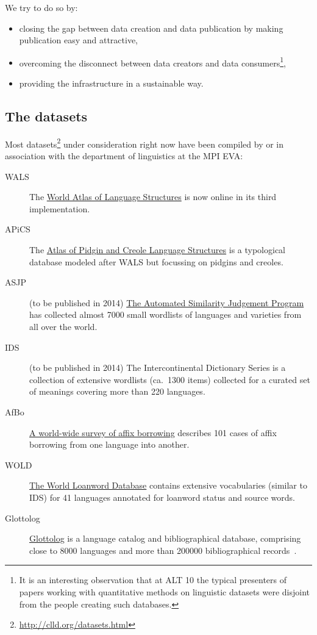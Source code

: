 \documentclass[a4paper,10pt]{article}
\begin{document}
We try to do so by:
\begin{itemize}
\item closing the gap between data creation and data publication by making publication easy and attractive,
\item overcoming the disconnect between data creators and data consumers\footnote{It is an interesting observation that at ALT 10 the typical presenters of papers working with quantitative methods on linguistic datasets were disjoint from the people creating such databases.},
\item providing the infrastructure in a sustainable way.
\end{itemize}

\subsection{The datasets}
Most datasets\footnote{\url{http://clld.org/datasets.html}} under consideration right now
have been compiled by or in association with the department of linguistics at the MPI EVA:
\begin{description}
\item[WALS] The \href{http://wals.info}{World Atlas of Language Structures} is now online in its third implementation.
\item[APiCS] The \href{http://apics-online.info}{Atlas of Pidgin and Creole Language Structures} is a typological database modeled after WALS but focussing on pidgins and creoles.
\item[ASJP] (to be published in 2014) \href{http://wwwstaff.eva.mpg.de/~wichmann/ASJPHomePage.htm}{The Automated Similarity Judgement Program} has collected almost 7000 small wordlists of languages and varieties from all over the world.
\item[IDS] (to be published in 2014) The Intercontinental Dictionary Series is a collection of extensive wordlists (ca.~1300 items)
collected for a curated set of meanings covering more than 220 languages.
\item[AfBo] \href{http://afbo.info/}{A world-wide survey of affix borrowing} describes 101 cases of affix borrowing from one language into another.
\item[WOLD] \href{http://wold.livingsources.org}{The World Loanword Database} contains extensive vocabularies (similar to IDS) for 41 languages annotated for loanword status and source words.
\item[Glottolog] \href{http://glottolog.org}{Glottolog} is a language catalog and bibliographical database, comprising close to 8000 languages and more than 200000 bibliographical records~\cite{nordhoff2012}.
\end{description}
\end{document}
